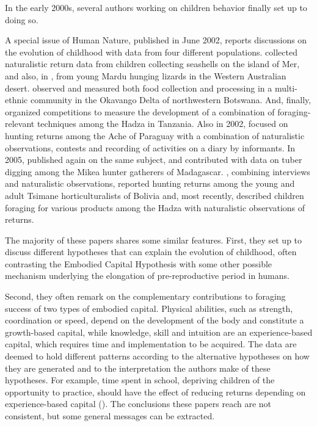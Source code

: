 In the early 2000s, several authors working on children behavior finally set up to doing so. 

A special issue of Human Nature, published in June 2002, reports discussions on the evolution of childhood with data from four different populations. \cite{bird_children_2002} collected naturalistic return data from children collecting seashells on the island of Mer, and also, in \cite{bird_constraints_2002}, from young Mardu hunging lizards in the Western Australian desert. \cite{bock_learning_2002} observed and measured both food collection and processing in a multi-ethnic community in the Okavango Delta of northwestern Botswana. And, finally, \cite{blurton_jones_selection_2002} organized competitions to measure the development of a combination of foraging-relevant techniques among the Hadza in Tanzania. 
Also in 2002, \cite{walker_age-dependency_2002} focused on hunting returns among the Ache of Paraguay with a combination of naturalistic observations, contests and recording of activities on a diary by informants. 
In 2005, \cite{bock_what_2005} published again on the same subject, and \cite{tucker_growing_2005} contributed with data on tuber digging among the Mikea hunter gatherers of Madagascar. 
\cite{gurven_how_2006}, combining interviews and naturalistic observations, reported hunting returns among the young and adult Tsimane horticulturalists of Bolivia and, most recently, \cite{crittenden_juvenile_2013} described children foraging for various products among the Hadza with naturalistic observations of returns.

The majority of these papers shares some similar features. 
First, they set up to discuss different hypotheses that can explain the evolution of childhood, often contrasting the Embodied Capital Hypothesis with some other possible mechanism underlying the elongation of pre-reproductive period in humans. 

Second, they often remark on the complementary contributions to foraging success of two types of embodied capital. Physical abilities, such as strength, coordination or speed, depend on the development of the body and constitute a growth-based capital, while knowledge, skill and intuition are an experience-based capital, which requires time and implementation to be acquired. 
The data are deemed to hold different patterns according to the alternative hypotheses on how they are generated and to the interpretation the authors make of these hypotheses. For example, time spent in school, depriving children of the opportunity to practice, should have the effect of reducing returns depending on experience-based capital (\cite{blurton_jones_selection_2002}).
The conclusions these papers reach are not consistent, but some general messages can be extracted. 

